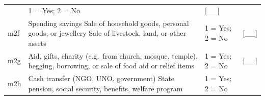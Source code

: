 \documentclass[12pt,a4paper]{book}
\theoremstyle{definition}
\theoremstyle{definition}
\theoremstyle{definition}
\theoremstyle{remark}
\begin{document}
\begin{longtable}[]{@{}llll@{}}
\begin{minipage}[t]{0.41\columnwidth}
\end{minipage} & \begin{minipage}[t]{0.25\columnwidth}\raggedright
1 = Yes; 2 = No\strut
\end{minipage} & \begin{minipage}[t]{0.13\columnwidth}\raggedright
{[}\_\_{]}\strut
\end{minipage}\tabularnewline
\begin{minipage}[t]{0.09\columnwidth}\raggedright
m2f\strut
\end{minipage} & \begin{minipage}[t]{0.41\columnwidth}\raggedright
Spending savings Sale of household goods, personal goods, or jewellery
Sale of livestock, land, or other assets\strut
\end{minipage} & \begin{minipage}[t]{0.25\columnwidth}\raggedright
1 = Yes; 2 = No\strut
\end{minipage} & \begin{minipage}[t]{0.13\columnwidth}\raggedright
{[}\_\_{]}\strut
\end{minipage}\tabularnewline
\begin{minipage}[t]{0.09\columnwidth}\raggedright
m2g\strut
\end{minipage} & \begin{minipage}[t]{0.41\columnwidth}\raggedright
Aid, gifts, charity (e.g.~from church, mosque, temple), begging,
borrowing, or sale of food aid or relief items\strut
\end{minipage} & \begin{minipage}[t]{0.25\columnwidth}\raggedright
1 = Yes; 2 = No\strut
\end{minipage} & \begin{minipage}[t]{0.13\columnwidth}\raggedright
{[}\_\_{]}\strut
\end{minipage}\tabularnewline
\begin{minipage}[t]{0.09\columnwidth}\raggedright
m2h\strut
\end{minipage} & \begin{minipage}[t]{0.41\columnwidth}\raggedright
Cash transfer (NGO, UNO, government) State pension, social security,
benefits, welfare program\strut
\end{minipage} & \begin{minipage}[t]{0.25\columnwidth}\raggedright
1 = Yes; 2 = No\strut
\end{minipage} & \begin{minipage}[t]{0.13\columnwidth}\raggedright

\end{minipage}
\end{longtable}
\end{document}
